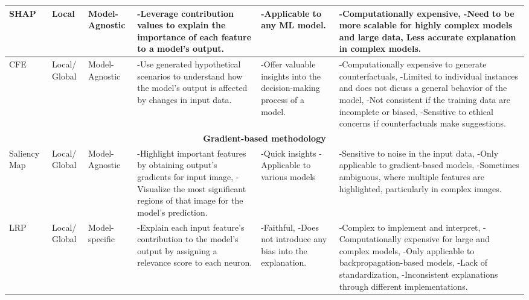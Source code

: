 \documentclass[final,5p,times,twocolumn]{elsarticle}
\begin{document}
\begin{table}[!h]
\begin{center}
\begin{tabular}{m{40pt}|m{25pt}|m{45pt}|m{110pt}|m{70pt}|m{150pt}}
        SHAP~\cite{lundberg2017unified} &Local &Model-Agnostic&-Leverage contribution values to explain the importance of each feature to a model's output.&-Applicable to any ML model.&-Computationally expensive, \newline -Need to be more scalable for highly complex models and large data, \newline
        Less accurate explanation in complex models. \\  \hline
        CFE~\cite{wachter2017counterfactual} &Local/ Global &Model-Agnostic&-Use generated hypothetical scenarios to understand how the model's output is affected by changes in input data.&-Offer valuable insights into the decision-making process of a model.& -Computationally expensive to generate counterfactuals, \newline   -Limited to individual instances and does not dicuss a general behavior of the model, \newline -Not consistent if the training data are incomplete or biased, \newline   -Sensitive to ethical concerns if counterfactuals make suggestions. \\  \hline
        \multicolumn{6}{c}{\textbf{Gradient-based methodology}}\\ \hline
        Saliency Map~\cite{simonyan2013deep} &Local/ Global &Model-Agnostic&-Highlight important features by obtaining output's gradients for input image, \newline -Visualize the most significant regions of that image for the model's prediction. &-Quick insights \newline -Applicable to various models&-Sensitive to noise in the input data, \newline-Only applicable to gradient-based models, \newline-Sometimes ambiguous, where multiple features are highlighted, particularly in complex images. \\ \hline 
        LRP~\cite{montavon2019layer} &Local/ Global &Model-specific&-Explain each input feature's contribution to the model's output by assigning a relevance score to each neuron.&-Faithful, \newline -Does not introduce any bias into the explanation.&-Complex to implement and interpret, \newline -Computationally expensive for large and complex models, \newline -Only applicable to backpropagation-based models, \newline -Lack of standardization, \newline -Inconsistent explanations through different implementations. \\ \hline

\end{tabular}
\end{center}
\end{table}
\end{document}

